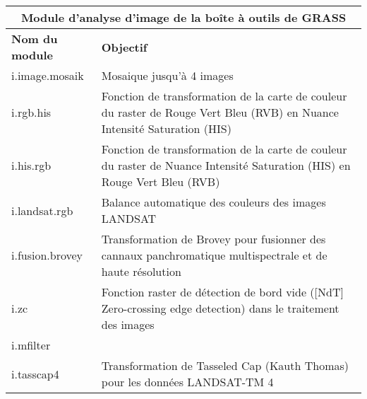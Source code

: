 \begin{table}[H]
\centering
 \begin{tabular}{|p{4cm}|p{10cm}|}
  \hline \multicolumn{2}{|c|}{\textbf{Module d'analyse d'image de la boîte à outils de GRASS}} \\
  \hline \textbf{Nom du module} & \textbf{Objectif} \\
  \hline i.image.mosaik & Mosaique jusqu'à 4 images\\
  \hline i.rgb.his & Fonction de transformation de la carte de couleur du raster de Rouge Vert Bleu (RVB) en Nuance Intensité Saturation (HIS)\\
  \hline i.his.rgb & Fonction de transformation de la carte de couleur du raster de Nuance Intensité Saturation (HIS) en Rouge Vert Bleu (RVB) \\
  \hline i.landsat.rgb & Balance automatique des couleurs des images LANDSAT \\
  \hline i.fusion.brovey & Transformation de Brovey pour fusionner des cannaux panchromatique multispectrale et de haute résolution\\
  \hline i.zc & Fonction raster de détection de bord vide ([NdT] Zero-crossing edge detection) dans le traitement des images \\
  \hline i.mfilter &  \\
  \hline i.tasscap4 & Transformation de Tasseled Cap (Kauth Thomas) pour les données LANDSAT-TM 4 \\

\end{tabular}
\end{table}
